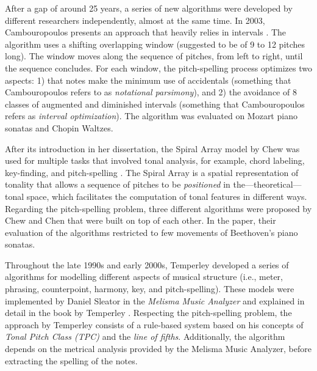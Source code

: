 After a gap of around 25 years, a series of new algorithms were developed by different researchers independently, almost at the same time. In 2003, Cambouropoulos presents an approach that heavily relies in intervals \cite{cambouropoulos2003pitch}. The algorithm uses a shifting overlapping window (suggested to be of 9 to 12 pitches long). The window moves along the sequence of pitches, from left to right, until the sequence concludes. For each window, the pitch-spelling process optimizes two aspects: 1) that notes make the minimum use of accidentals (something that Cambouropoulos refers to as \emph{notational parsimony}), and 2) the avoidance of 8 classes of augmented and diminished intervals (something that Cambouropoulos refers as \emph{interval optimization}). The algorithm was evaluated on Mozart piano sonatas and Chopin Waltzes.

After its introduction in her dissertation, the Spiral Array model by Chew was used for multiple tasks that involved tonal analysis, for example, chord labeling, key-finding, and pitch-spelling \cite{chew2000towards}. The Spiral Array is a spatial representation of tonality that allows a sequence of pitches to be \emph{positioned} in the---theoretical---tonal space, which facilitates the computation of tonal features in different ways. Regarding the pitch-spelling problem, three different algorithms were proposed by Chew and Chen \cite{chew2003determining} that were built on top of each other. In the paper, their evaluation of the algorithms restricted to few movements of Beethoven's piano sonatas.

Throughout the late 1990s and early 2000s, Temperley developed a series of algorithms for modelling different aspects of musical structure (i.e., meter, phrasing, counterpoint, harmony, key, and pitch-spelling). These models were implemented by Daniel Sleator in the \emph{Melisma Music Analyzer} and explained in detail in the book by Temperley \cite{temperley2004cognition}. Respecting the pitch-spelling problem, the approach by Temperley consists of a rule-based system based on his concepts of \emph{Tonal Pitch Class (TPC)} and the \emph{line of fifths}. Additionally, the algorithm depends on the metrical analysis provided by the Melisma Music Analyzer, before extracting the spelling of the notes.

